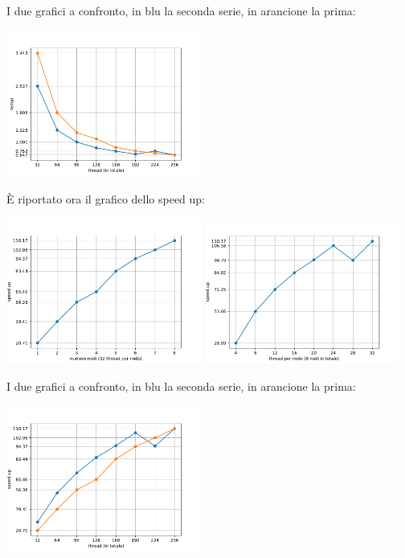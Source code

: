 \documentclass[12pt,openany]{report}
\begin{document}
I due grafici a confronto, in blu la seconda serie, in arancione la prima:
\begin{center}
    \includegraphics[width=0.48\textwidth ]{images/tempi_MISTO_MT.pdf}
\end{center}
È riportato ora il grafico dello speed up:
\begin{center}
    \includegraphics[width=0.48\textwidth ]{images/speedup_MISTO_M.pdf}
    \includegraphics[width=0.48\textwidth ]{images/speedup_MISTO_T.pdf}
\end{center}
I due grafici a confronto, in blu la seconda serie, in arancione la prima:
\begin{center}
    \includegraphics[width=0.48\textwidth ]{images/speedup_MISTO_MT.pdf}
\end{center}
\end{document}

